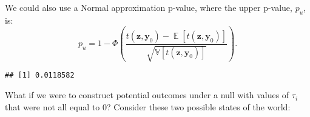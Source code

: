 \documentclass[12pt,leqno]{article}
\newenvironment{Shaded}{\begin{snugshade}}{\end{snugshade}}
\newcommand{\DataTypeTok}[1]{\textcolor[rgb]{0.13,0.29,0.53}{#1}}
\newcommand{\DecValTok}[1]{\textcolor[rgb]{0.00,0.00,0.81}{#1}}
\newcommand{\KeywordTok}[1]{\textcolor[rgb]{0.13,0.29,0.53}{\textbf{#1}}}
\newcommand{\NormalTok}[1]{#1}
\newcommand{\OperatorTok}[1]{\textcolor[rgb]{0.81,0.36,0.00}{\textbf{#1}}}
\newcommand{\StringTok}[1]{\textcolor[rgb]{0.31,0.60,0.02}{#1}}
\theoremstyle{newstyle}
\DeclareMathOperator{\E}{\mathbb{E}}
\begin{document}
\newcommand{\V}{\mathbb{V}}

We could also use a Normal approximation p-value, where the upper
p-value, \(p_u\), is: \begin{equation}
p_u =  1 - \Phi\left(\frac{t\left(\mathbf{z}, \mathbf{y}_0 \right) - \E\left[t\left(\mathbf{z}, \mathbf{y}_0 \right)\right]}{\sqrt{\mathbb{V}\left[t\left(\mathbf{z}, \mathbf{y}_0 \right)\right]}}\right).
\end{equation}

\begin{Shaded}
\end{Shaded}

\begin{verbatim}
## [1] 0.0118582
\end{verbatim}

What if we were to construct potential outcomes under a null with values
of \(\tau_i\) that were not all equal to 0? Consider these two possible
states of the world:
\end{document}
